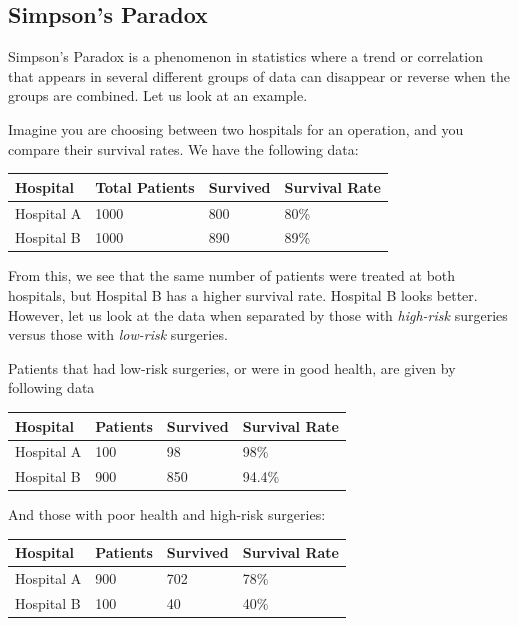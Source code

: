 \subsection{Simpson's Paradox}
Simpson's Paradox is a phenomenon in statistics where a trend or correlation that appears in several different groups of data can disappear or reverse when the groups are combined. Let us look at an example.

Imagine you are choosing between two hospitals for an operation, and you
compare their survival rates. We have the following data:

\begin{table}[!ht]
    \centering
    \begin{tabular}{|l|l|l|l|}
        \hline
        \textbf{Hospital} & \textbf{Total Patients} & \textbf{Survived} & \textbf{Survival Rate} \\ \hline
        Hospital A        & 1000                    & 800               & 80\%                   \\ \hline
        Hospital B        & 1000                    & 890               & 89\%                   \\ \hline
    \end{tabular}
\end{table}

From this, we see that the same number of patients were treated at both hospitals, but Hospital B has a higher survival rate. Hospital B looks better. However, let us look at the data when separated by those with \textit{high-risk} surgeries versus those with \textit{low-risk} surgeries.

Patients that had low-risk surgeries, or were in good health, are given by following data
\begin{table}[H]
    \centering
    \begin{tabular}{|l|l|l|l|}
        \hline
        \textbf{Hospital} & \textbf{Patients} & \textbf{Survived} & \textbf{Survival Rate} \\ \hline
        Hospital A        & 100               & 98                & 98\%                   \\ \hline
        Hospital B        & 900               & 850               & 94.4\%                 \\ \hline
    \end{tabular}
\end{table}
And those with poor health and high-risk surgeries:
\begin{table}[H]
    \centering
    \begin{tabular}{|l|l|l|l|}
        \hline
        \textbf{Hospital} & \textbf{Patients} & \textbf{Survived} & \textbf{Survival Rate} \\ \hline
        Hospital A        & 900               & 702               & 78\%                   \\ \hline
        Hospital B        & 100               & 40                & 40\%                   \\ \hline
    \end{tabular}
\end{table}

